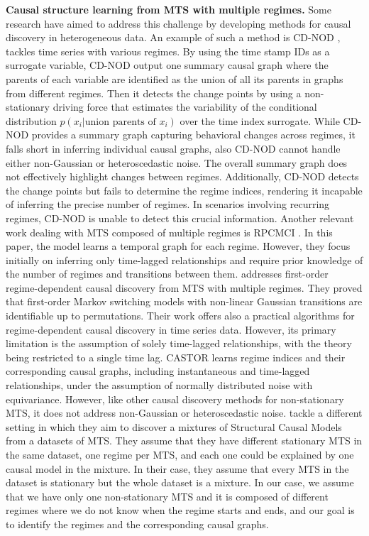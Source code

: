 \textbf{Causal structure learning from MTS with multiple regimes. }Some research have aimed to address this challenge by developing methods for causal discovery in heterogeneous data. An example of such a method is CD-NOD \citep{huang2020causal}, tackles time series with various regimes. By using the time stamp IDs as a surrogate variable, CD-NOD output one summary causal graph where the parents of each variable are identified as the union of all its parents in graphs from different regimes. Then it detects the change points by using a non-stationary driving force that estimates the variability of the conditional distribution $p(x_i|\text{union parents of } x_i)$ over the time index surrogate. While CD-NOD provides a summary graph capturing behavioral changes across regimes, it falls short in inferring individual causal graphs, also CD-NOD cannot handle either non-Gaussian or heteroscedastic noise. The overall summary graph does not effectively highlight changes between regimes. Additionally, CD-NOD detects the change points but fails to determine the regime indices, rendering it incapable of inferring the precise number of regimes. In scenarios involving recurring regimes, CD-NOD is unable to detect this crucial information. Another relevant work dealing with MTS composed of multiple regimes is RPCMCI \citep{saggioro2020reconstructing}. In this paper, the model \citep{saggioro2020reconstructing} learns a temporal graph for each regime. However, they focus initially on inferring only time-lagged relationships and require prior knowledge of the number of regimes and transitions between them. \citep{balsellsidentifiability} addresses first-order regime-dependent causal discovery from MTS with multiple regimes. They proved that first-order Markov switching models with non-linear Gaussian transitions are identifiable up to permutations. Their work offers also a practical algorithms for regime-dependent causal discovery in time series data. However, its primary limitation is the assumption of solely time-lagged relationships, with the theory being restricted to a single time lag. CASTOR \citep{rahmanicausal} learns regime indices and their corresponding causal graphs, including instantaneous and time-lagged relationships, under the assumption of normally distributed noise with equivariance. However, like other causal discovery methods for non-stationary MTS, it does not address non-Gaussian or heteroscedastic noise. \citep{varambally2023discovering} tackle a different setting in which they aim to discover a mixtures of Structural Causal Models from a datasets of MTS. They assume that they have different stationary MTS in the same dataset, one regime per MTS, and each one could be explained by one causal model in the mixture. In their case, they assume that every MTS in the dataset is stationary but the whole dataset is a mixture. In our case, we assume that we have only one non-stationary MTS and it is composed of different regimes where we do not know when the regime starts and ends, and our goal is to identify the regimes and the corresponding causal graphs.